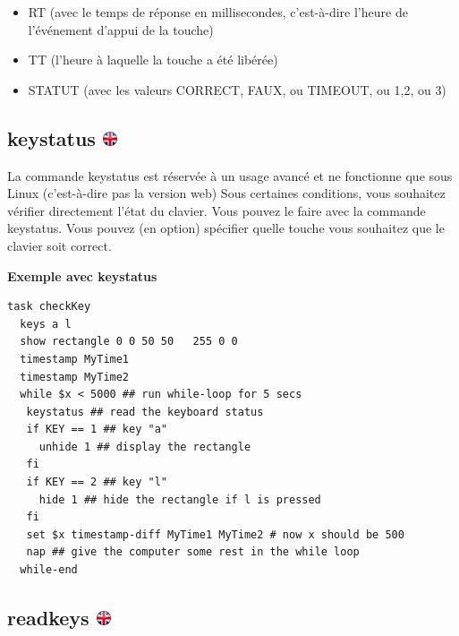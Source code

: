 \documentclass[
]{book}
\providecommand{\tightlist}{%
  \setlength{\itemsep}{0pt}\setlength{\parskip}{0pt}}
\begin{document}
\begin{itemize}
\tightlist
\item
  RT (avec le temps de réponse en millisecondes, c'est-à-dire l'heure de l'événement d'appui de la touche)
\item
  TT (l'heure à laquelle la touche a été libérée)
\item
  STATUT (avec les valeurs CORRECT, FAUX, ou TIMEOUT, ou 1,2, ou 3)
\end{itemize}

\hypertarget{keystatus}{%
\subsection[keystatus ]{\texorpdfstring{keystatus \href{https://www.psytoolkit.org/doc3.2.0/syntax.html\#task-keystatus}{\protect\includegraphics{img/ukflag.png}}}{keystatus }}\label{keystatus}}

La commande keystatus est réservée à un usage avancé et ne fonctionne que sous Linux (c'est-à-dire pas la version web)
Sous certaines conditions, vous souhaitez vérifier directement l'état du clavier. Vous pouvez le faire avec la commande keystatus. Vous pouvez (en option) spécifier quelle touche vous souhaitez que le clavier soit correct.

\textbf{Exemple avec keystatus}

\begin{verbatim}
task checkKey
  keys a l
  show rectangle 0 0 50 50   255 0 0
  timestamp MyTime1
  timestamp MyTime2
  while $x < 5000 ## run while-loop for 5 secs
   keystatus ## read the keyboard status
   if KEY == 1 ## key "a"
     unhide 1 ## display the rectangle
   fi
   if KEY == 2 ## key "l"
     hide 1 ## hide the rectangle if l is pressed
   fi
   set $x timestamp-diff MyTime1 MyTime2 # now x should be 500
   nap ## give the computer some rest in the while loop
  while-end
\end{verbatim}

\hypertarget{readkeys}{%
\subsection[readkeys ]{\texorpdfstring{readkeys \href{https://www.psytoolkit.org/doc3.2.0/syntax.html\#task-readkeys}{\protect\includegraphics{img/ukflag.png}}}{readkeys }}\label{readkeys}}
\end{document}
